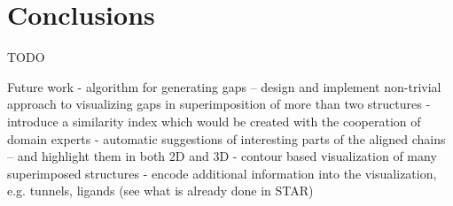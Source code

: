\documentclass[twocolumn]{bmcart}%
\begin{document}
\section*{Conclusions}
TODO

Future work
- algorithm for generating gaps -- design and implement non-trivial approach to visualizing gaps in superimposition of more than two structures
- introduce a similarity index which would be created with the cooperation of domain experts
- automatic suggestions of interesting parts of the aligned chains -- and highlight them in both 2D and 3D
- contour based visualization of many superimposed structures
- encode additional information into the visualization, e.g. tunnels, ligands (see what is already done in STAR)
\end{document}
